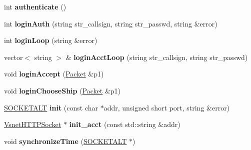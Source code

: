 \begin{DoxyCompactItemize}
\item 
int {\bfseries authenticate} ()\hypertarget{classNetClient_aa1dc9fa429622afd81599b1529a480e9}{}\label{classNetClient_aa1dc9fa429622afd81599b1529a480e9}

\item 
int {\bfseries login\+Auth} (string str\+\_\+callsign, string str\+\_\+passwd, string \&error)\hypertarget{classNetClient_afe37404d9eefada72039510926caa349}{}\label{classNetClient_afe37404d9eefada72039510926caa349}

\item 
int {\bfseries login\+Loop} (string \&error)\hypertarget{classNetClient_a06aad9a6da336ec61b249a25ebdc3c0c}{}\label{classNetClient_a06aad9a6da336ec61b249a25ebdc3c0c}

\item 
vector$<$ string $>$ \& {\bfseries login\+Acct\+Loop} (string str\+\_\+callsign, string str\+\_\+passwd)\hypertarget{classNetClient_aa5d52b7ce24e8c4b7ff2176e1cd528df}{}\label{classNetClient_aa5d52b7ce24e8c4b7ff2176e1cd528df}

\item 
void {\bfseries login\+Accept} (\hyperlink{classPacket}{Packet} \&p1)\hypertarget{classNetClient_a17fc61252f21d1b800304af63eac16b6}{}\label{classNetClient_a17fc61252f21d1b800304af63eac16b6}

\item 
void {\bfseries login\+Choose\+Ship} (\hyperlink{classPacket}{Packet} \&p1)\hypertarget{classNetClient_a49f576f8d257c2d45f45d4a19a979c20}{}\label{classNetClient_a49f576f8d257c2d45f45d4a19a979c20}

\item 
\hyperlink{classSOCKETALT}{S\+O\+C\+K\+E\+T\+A\+LT} {\bfseries init} (const char $\ast$addr, unsigned short port, string \&error)\hypertarget{classNetClient_a51c20604ff8fcab01f82c1ddeeef61aa}{}\label{classNetClient_a51c20604ff8fcab01f82c1ddeeef61aa}

\item 
\hyperlink{classVsnetHTTPSocket}{Vsnet\+H\+T\+T\+P\+Socket} $\ast$ {\bfseries init\+\_\+acct} (const std\+::string \&addr)\hypertarget{classNetClient_a9c200b0edca9b4f8bf95e1cc10340961}{}\label{classNetClient_a9c200b0edca9b4f8bf95e1cc10340961}

\item 
void {\bfseries synchronize\+Time} (\hyperlink{classSOCKETALT}{S\+O\+C\+K\+E\+T\+A\+LT} $\ast$)\hypertarget{classNetClient_a6ab365973d0019e1fb4c81b9150e15c3}{}\label{classNetClient_a6ab365973d0019e1fb4c81b9150e15c3}


\end{DoxyCompactItemize}
